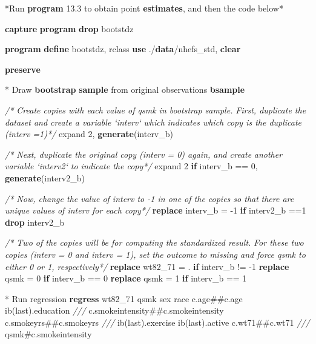 \documentclass[
  10pt,
]{book}
\newenvironment{Shaded}{\begin{snugshade}}{\end{snugshade}}
\newcommand{\CommentTok}[1]{\textcolor[rgb]{0.56,0.35,0.01}{\textit{#1}}}
\newcommand{\FunctionTok}[1]{\textcolor[rgb]{0.00,0.00,0.00}{#1}}
\newcommand{\KeywordTok}[1]{\textcolor[rgb]{0.13,0.29,0.53}{\textbf{#1}}}
\newcommand{\NormalTok}[1]{#1}
\begin{document}
\begin{Shaded}
\begin{Highlighting}[]
\NormalTok{*Run }\KeywordTok{program}\NormalTok{ 13.3 to obtain point }\KeywordTok{estimates}\NormalTok{, and then the code below*}

\KeywordTok{capture} \KeywordTok{program} \KeywordTok{drop}\NormalTok{ bootstdz}

\KeywordTok{program} \KeywordTok{define}\NormalTok{ bootstdz, rclass}
\KeywordTok{use}\NormalTok{ ./}\KeywordTok{data}\NormalTok{/nhefs_std, }\KeywordTok{clear}

\KeywordTok{preserve}

\NormalTok{* Draw }\KeywordTok{bootstrap} \KeywordTok{sample}\NormalTok{ from original observations}
\KeywordTok{bsample} 
		
\CommentTok{/* Create copies with each value of qsmk in bootstrap sample.}
\CommentTok{First, duplicate the dataset and create a variable `interv` which}
\CommentTok{indicates which copy is the duplicate (interv =1)*/}
\NormalTok{expand 2, }\KeywordTok{generate}\NormalTok{(interv_b)}

\CommentTok{/* Next, duplicate the original copy (interv = 0) again, and create}
\CommentTok{another variable `interv2` to indicate the copy*/}
\NormalTok{expand 2 }\KeywordTok{if}\NormalTok{ interv_b == 0, }\KeywordTok{generate}\NormalTok{(interv2_b)}

\CommentTok{/* Now, change the value of interv to -1 in one of the copies so that}
\CommentTok{there are unique values of interv for each copy*/}
\KeywordTok{replace}\NormalTok{ interv_b = -1  }\KeywordTok{if}\NormalTok{ interv2_b ==1}
\KeywordTok{drop}\NormalTok{ interv2_b}

\CommentTok{/* Two of the copies will be for computing the standardized result.}
\CommentTok{For these two copies (interv = 0 and interv = 1), set the outcome to}
\CommentTok{missing and force qsmk to either 0 or 1, respectively*/}
\KeywordTok{replace}\NormalTok{ wt82_71 = . }\KeywordTok{if}\NormalTok{ interv_b != -1}
\KeywordTok{replace}\NormalTok{ qsmk = 0 }\KeywordTok{if}\NormalTok{ interv_b == 0}
\KeywordTok{replace}\NormalTok{ qsmk = 1 }\KeywordTok{if}\NormalTok{ interv_b == 1}

\NormalTok{* Run regression}
\KeywordTok{regress}\NormalTok{ wt82_71 qsmk sex race c.age##c.age ib(}\FunctionTok{last}\NormalTok{).education }\CommentTok{///}
\NormalTok{  c.smokeintensity##c.smokeintensity c.smokeyrs##c.smokeyrs }\CommentTok{///}
\NormalTok{  ib(}\FunctionTok{last}\NormalTok{).exercise ib(}\FunctionTok{last}\NormalTok{).active c.wt71##c.wt71 }\CommentTok{///}
\NormalTok{  qsmk#c.smokeintensity}


\end{Highlighting}
\end{Shaded}
\end{document}
